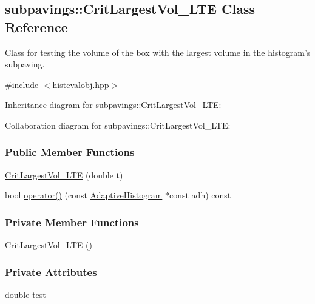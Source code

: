 \hypertarget{classsubpavings_1_1CritLargestVol__LTE}{\subsection{subpavings\-:\-:\-Crit\-Largest\-Vol\-\_\-\-L\-T\-E \-Class \-Reference}
\label{classsubpavings_1_1CritLargestVol__LTE}
}


\-Class for testing the volume of the box with the largest volume in the histogram's subpaving.  




{\ttfamily \#include $<$histevalobj.\-hpp$>$}



\-Inheritance diagram for subpavings\-:\-:\-Crit\-Largest\-Vol\-\_\-\-L\-T\-E\-:


\-Collaboration diagram for subpavings\-:\-:\-Crit\-Largest\-Vol\-\_\-\-L\-T\-E\-:
\subsubsection*{\-Public \-Member \-Functions}
\begin{DoxyCompactItemize}
\item 
\hyperlink{classsubpavings_1_1CritLargestVol__LTE_af34556390c9d49e2fcd9f4ea480f864a}{\-Crit\-Largest\-Vol\-\_\-\-L\-T\-E} (double t)
\item 
bool \hyperlink{classsubpavings_1_1CritLargestVol__LTE_a47c51f066e79dc7809b07e6e7e235aee}{operator()} (const \hyperlink{classsubpavings_1_1AdaptiveHistogram}{\-Adaptive\-Histogram} $\ast$const adh) const 
\end{DoxyCompactItemize}
\subsubsection*{\-Private \-Member \-Functions}
\begin{DoxyCompactItemize}
\item 
\hyperlink{classsubpavings_1_1CritLargestVol__LTE_aa3dae0ecbe7732f2e52f3e8cd81a14dd}{\-Crit\-Largest\-Vol\-\_\-\-L\-T\-E} ()
\end{DoxyCompactItemize}
\subsubsection*{\-Private \-Attributes}
\begin{DoxyCompactItemize}
\item 
double \hyperlink{classsubpavings_1_1CritLargestVol__LTE_ae4a0868c2ba9ef0f9937c738b747647d}{test}
\end{DoxyCompactItemize}


